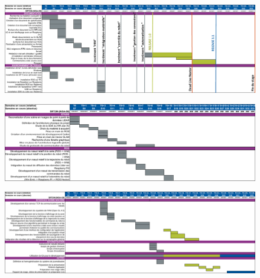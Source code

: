 \begin{figure}
\centering
    \includegraphics[width=1.\linewidth]{figures/Planning-1}  
  \label{fig:planning-1}
\end{figure}

\begin{figure}
\centering
    \includegraphics[width=1.\linewidth]{figures/Planning-2}  
  \label{fig:planning-2}
\end{figure}

\begin{figure}
\centering
    \includegraphics[width=1.\linewidth]{figures/Planning-3}  
  \label{fig:planning-3}
\end{figure}